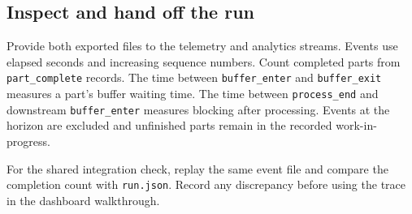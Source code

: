 \subsection{Inspect and hand off the run}
Provide both exported files to the telemetry and analytics streams.
Events use elapsed seconds and increasing sequence numbers. Count
completed parts from \texttt{part\_complete} records. The time between
\texttt{buffer\_enter} and \texttt{buffer\_exit} measures a part's
buffer waiting time. The time between \texttt{process\_end} and
downstream \texttt{buffer\_enter} measures blocking after processing.
Events at the horizon are excluded and unfinished parts remain in the
recorded work-in-progress.

For the shared integration check, replay the same event file and compare
the completion count with \texttt{run.json}. Record any discrepancy
before using the trace in the dashboard walkthrough.
